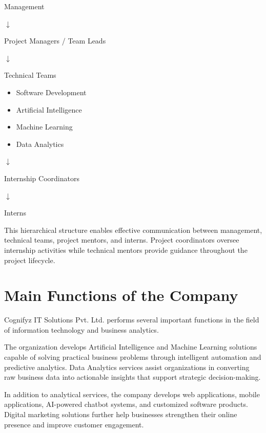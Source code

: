 \documentclass[12pt,a4paper]{report}
\begin{document}
\begin{center}

Management

$\downarrow$

Project Managers / Team Leads

$\downarrow$

Technical Teams

\begin{itemize}
\item Software Development
\item Artificial Intelligence
\item Machine Learning
\item Data Analytics
\end{itemize}

$\downarrow$

Internship Coordinators

$\downarrow$

Interns

\end{center}

This hierarchical structure enables effective communication between management, technical teams, project mentors, and interns. Project coordinators oversee internship activities while technical mentors provide guidance throughout the project lifecycle.


\section{Main Functions of the Company}

Cognifyz IT Solutions Pvt. Ltd. performs several important functions in the field of information technology and business analytics.

The organization develops Artificial Intelligence and Machine Learning solutions capable of solving practical business problems through intelligent automation and predictive analytics. Data Analytics services assist organizations in converting raw business data into actionable insights that support strategic decision-making.

In addition to analytical services, the company develops web applications, mobile applications, AI-powered chatbot systems, and customized software products. Digital marketing solutions further help businesses strengthen their online presence and improve customer engagement.
\end{document}

